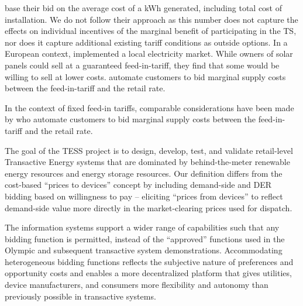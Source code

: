 \citet{sajjadi_transactive_2016} base their bid on the average cost of a kWh generated, including total cost of installation. We do not follow their approach as this number does not capture the effects on individual incentives of the marginal benefit of participating in the TS, nor does it capture additional existing tariff conditions as outside options. In a European context, \citet{ableitner_user_2020} implemented a local electricity market. While owners of solar panels could sell at a guaranteed feed-in-tariff, they find that some would be willing to sell at lower costs. \citet{mengelkamp_decentralizing_2018} automate customers to bid marginal supply costs between the feed-in-tariff and the retail rate.

In the context of fixed feed-in tariffs, comparable considerations have been made by \citet{mengelkamp_decentralizing_2018} who automate customers to bid marginal supply costs between the feed-in-tariff and the retail rate. 

The goal of the TESS project is to design, develop, test, and validate retail-level Transactive Energy systems that are dominated by behind-the-meter renewable energy resources and energy storage resources. Our definition differs from the cost-based ``prices to devices'' concept by including demand-side and DER bidding based on willingness to pay -- eliciting ``prices from devices'' to reflect demand-side value more directly in the market-clearing prices used for dispatch.

The information systems support a wider range of capabilities such that any  bidding function is permitted, instead of the ``approved'' functions used in the Olympic and subsequent transactive system demonstrations. Accommodating heterogeneous bidding functions reflects the subjective nature of preferences and opportunity costs and enables a more decentralized platform that gives utilities, device manufacturers, and consumers more flexibility and autonomy than previously possible in transactive systems.

